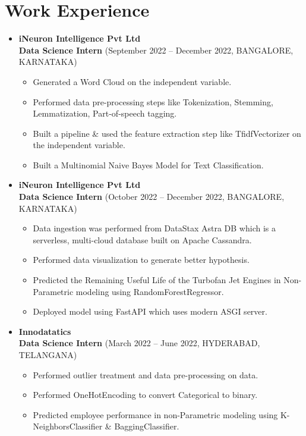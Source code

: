 \documentclass[a4paper,11pt]{article}
\begin{document}
\section*{Work Experience}
\begin{itemize}[leftmargin=*,label=--]
  \item \textbf{iNeuron Intelligence Pvt Ltd} \\
  \textbf{Data Science Intern} (September 2022 – December 2022, BANGALORE, KARNATAKA)
  \begin{itemize}[label={$\bullet$}]
    \item Generated a Word Cloud on the independent variable.
    \item Performed data pre-processing steps like Tokenization, Stemming, Lemmatization, Part-of-speech tagging.
    \item Built a pipeline \& used the feature extraction step like TfidfVectorizer on the independent variable.
    \item Built a Multinomial Naive Bayes Model for Text Classification.
  \end{itemize}
  
  \item \textbf{iNeuron Intelligence Pvt Ltd} \\
  \textbf{Data Science Intern} (October 2022 – December 2022, BANGALORE, KARNATAKA)
  \begin{itemize}[label={$\bullet$}]
    \item Data ingestion was performed from DataStax Astra DB which is a serverless, multi-cloud database built on Apache Cassandra.
    \item Performed data visualization to generate better hypothesis.
    \item Predicted the Remaining Useful Life of the Turbofan Jet Engines in Non-Parametric modeling using RandomForestRegressor.
    \item Deployed model using FastAPI which uses modern ASGI server.
  \end{itemize}

  \item \textbf{Innodatatics} \\
  \textbf{Data Science Intern} (March 2022 – June 2022, HYDERABAD, TELANGANA)
  \begin{itemize}[label={$\bullet$}]
    \item Performed outlier treatment and data pre-processing on data.
    \item Performed OneHotEncoding to convert Categorical to binary.
    \item Predicted employee performance in non-Parametric modeling using K-NeighborsClassifier \& BaggingClassifier.
  \end{itemize}


\end{itemize}
\end{document}
